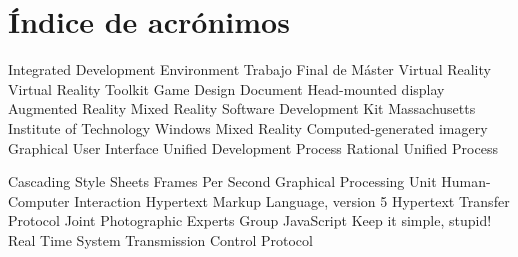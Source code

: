 \chapter*{Índice de acrónimos}
{
\small
\begin{acronym}[XXXXXXXX]

      {Integrated Development Environment}
      {Trabajo Final de Máster}
       {Virtual Reality}
     {Virtual Reality Toolkit}
      {Game Design Document}
      {Head-mounted display}
       {Augmented Reality}
       {Mixed Reality}
      {Software Development Kit}
      {Massachusetts Institute of Technology}
      {Windows Mixed Reality}
      {Computed-generated imagery}
      {Graphical User Interface}  
      {Unified Development Process}
      {Rational Unified Process}

     {Cascading Style Sheets}
     {Frames Per Second}
     {Graphical Processing Unit}
     {Human-Computer Interaction}
   {Hypertext Markup Language, version 5}
    {Hypertext Transfer Protocol}  
    {Joint Photographic Experts Group}
      {JavaScript}
    {Keep it simple, stupid!} 
     {Real Time System}
     {Transmission Control Protocol}  

\end{acronym}
}




